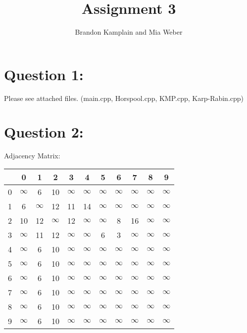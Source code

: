 \documentclass{article}
\begin{document}
\title{Assignment 3}
\author{Brandon Kamplain and Mia Weber}

\maketitle
\newpage

\section{Question 1:}
Please see attached files. (main.cpp, Horspool.cpp, KMP.cpp, Karp-Rabin.cpp)

\section{Question 2:}

\begin{center}
\noindent Adjacency Matrix:

\begin{tabular}{c || c | c | c | c | c | c | c | c | c | c |} 
 & 0 & 1 & 2 & 3 & 4 & 5 & 6 & 7 & 8 & 9 \\  [0.5ex] 
 \hline\hline
 0 & $\infty$ & 6 & 10 & $\infty$ & $\infty$ & $\infty$ & $\infty$ & $\infty$ & $\infty$ & $\infty$ \\ 
 \hline
 1 & 6 & $\infty$ & 12 & 11 & 14 & $\infty$ & $\infty$ & $\infty$ & $\infty$ & $\infty$ \\
 \hline
 2 & 10 & 12 & $\infty$ & 12 & $\infty$ & $\infty$ & 8 & 16 & $\infty$ & $\infty$ \\
 \hline
 3 & $\infty$ & 11 & 12 & $\infty$ & $\infty$ & 6 & 3 & $\infty$ & $\infty$ & $\infty$ \\
 \hline
 4 & $\infty$ & 6 & 10 & $\infty$ & $\infty$ & $\infty$ & $\infty$ & $\infty$ & $\infty$ & $\infty$ \\ 
  \hline
 5 & $\infty$ & 6 & 10 & $\infty$ & $\infty$ & $\infty$ & $\infty$ & $\infty$ & $\infty$ & $\infty$ \\ 
  \hline
 6 & $\infty$ & 6 & 10 & $\infty$ & $\infty$ & $\infty$ & $\infty$ & $\infty$ & $\infty$ & $\infty$ \\
  \hline
 7 & $\infty$ & 6 & 10 & $\infty$ & $\infty$ & $\infty$ & $\infty$ & $\infty$ & $\infty$ & $\infty$ \\
 \hline
 8 & $\infty$ & 6 & 10 & $\infty$ & $\infty$ & $\infty$ & $\infty$ & $\infty$ & $\infty$ & $\infty$ \\
 \hline
 9 & $\infty$ & 6 & 10 & $\infty$ & $\infty$ & $\infty$ & $\infty$ & $\infty$ & $\infty$ & $\infty$ \\  [1ex] 
 \hline
\end{tabular}
\end{center}
\end{document}
